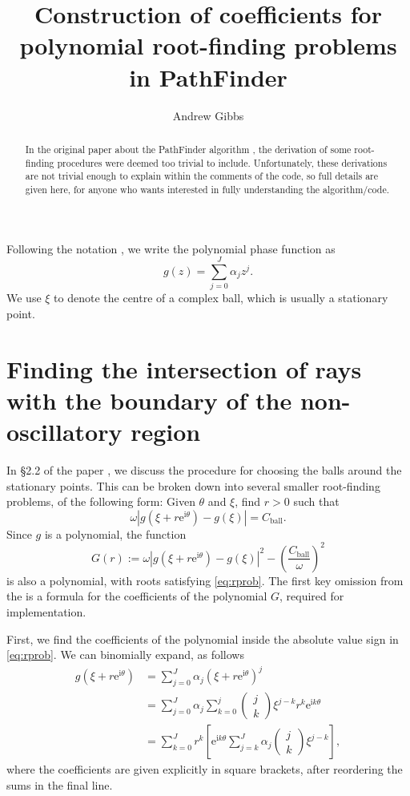 \documentclass[12pt]{article}
\title{Construction of coefficients for polynomial root-finding problems in PathFinder}
\author{Andrew Gibbs}
\newcommand{\re}{\mathrm{e}}
\newcommand{\ri}{\mathrm{i}}
\newcommand{\Cball}{C_{\mathrm{ball}}}
\begin{document}
	
	\maketitle
	
	\begin{abstract}
		In the original paper about the PathFinder algorithm \cite{PFpaper}, the derivation of some root-finding procedures were deemed too trivial to include. Unfortunately, these derivations are not trivial enough to explain within the comments of the code, so full details are given here, for anyone who wants interested in fully understanding the algorithm/code.
	\end{abstract}

Following the notation \cite{PFpaper}, we write the polynomial phase function as
\[
g(z) = \sum_{j=0}^J \alpha_j z^j.
\]
We use $\xi$ to denote the centre of a complex ball, which is usually a stationary point.

\section{Finding the intersection of rays with the boundary of the non-oscillatory region}

In \S2.2 of the paper \cite{PFpaper}, we discuss the procedure for choosing the balls around the stationary points. This can be broken down into several smaller root-finding problems, of the following form: Given $\theta$ and $\xi$, find $r>0$ such that
\begin{equation}\label{eq:rprob}
\omega\left|g(\xi+r\re^{\ri \theta})-g(\xi)\right|=\Cball.
\end{equation}
Since $g$ is a polynomial, the function
\begin{equation}\label{eq:G}
G(r) := \omega\left|g(\xi+r\re^{\ri \theta})-g(\xi)\right|^2-\left(\frac{\Cball}{\omega}\right)^2
\end{equation}
is also a polynomial, with roots satisfying \eqref{eq:rprob}. The first key omission from the \cite[\S2.2]{PFpaper} is a formula for the coefficients of the polynomial $G$, required for implementation.

First, we find the coefficients of the polynomial inside the absolute value sign in \eqref{eq:rprob}. We can binomially expand, as follows
\begin{align}
	g(\xi+r\re^{\ri \theta}) &= \sum_{j=0}^J\alpha_j(\xi+r\re^{\ri\theta})^j\nonumber\\
	&=\sum_{j=0}^J\alpha_j\sum_{k=0}^j\left(\begin{array}{c}
		j\\k
	\end{array}\right)
	\xi^{j-k}r^k\re^{\ri k \theta}\nonumber\\
	&=\sum_{k=0}^J r^k\left[\re^{\ri k \theta}\sum_{j=k}^J \alpha_j\left(\begin{array}{c}
		j\\k
	\end{array}\right)
	\xi^{j-k}\right]\label{eq:polysplit},
\end{align}
where the coefficients are given explicitly in square brackets, after reordering the sums in the final line.
\end{document}
